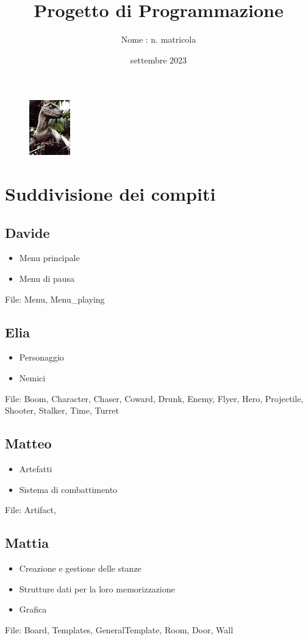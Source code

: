 \documentclass[12pt]{article}
\title{Progetto di Programmazione}
\author{Nome : n. matricola}
\date{settembre 2023}
\begin{document}
\maketitle

\begin{figure}[h]
    \centering
    \includegraphics{raptor.jpg}
\end{figure}

\newpage


\section*{Suddivisione dei compiti}
\subsection*{Davide}
\begin{itemize}
    \item Menu principale
    \item Menu di pausa
\end{itemize}
File: Menu, Menu\_playing
 
\subsection*{Elia}
\begin{itemize}
    \item Personaggio 
    \item Nemici
\end{itemize}
File: Boom, Character, Chaser, Coward, Drunk, Enemy, Flyer, Hero, Projectile, Shooter, Stalker, Time, Turret

\subsection*{Matteo}
\begin{itemize}
    \item Artefatti
    \item Sistema di combattimento
\end{itemize}
File: Artifact, 

\subsection*{Mattia}
\begin{itemize}
    \item Creazione e gestione delle stanze 
    \item Strutture dati per la loro memorizzazione
    \item Grafica
\end{itemize}
File: Board, Templates, GeneralTemplate, Room, Door, Wall
\end{document}
